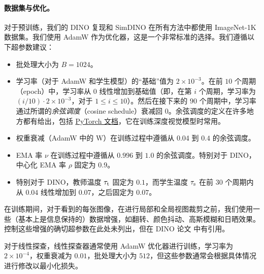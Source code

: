 \documentclass[../../book-main_zh.tex]{subfiles}
\begin{document}
\paragraph{数据集与优化。} 对于预训练，我们的 DINO 复现和 SimDINO 在所有方法中都使用 ImageNet-1K 数据集。我们使用 AdamW \citep{Loshchilov2017DecoupledWD} 作为优化器，这是一个非常标准的选择。我们遵循以下超参数建议：
\begin{itemize}
    \item 批处理大小为 \(B = 1024\)。
    \item 学习率（对于 AdamW 和学生模型）的“基础”值为 \(2 \times 10^{-3}\)。在前 \(10\) 个周期（epoch）中，学习率从 \(0\) 线性增加到基础值（即，在第 \(i\) 个周期，学习率为 \((i/10) \cdot 2 \times 10^{-3}\)，对于 \(1 \leq i \leq 10\)）。然后在接下来的 \(90\) 个周期中，学习率通过所谓的\textit{余弦调度}（cosine schedule）衰减回 \(0\)。余弦调度的定义在许多地方都有给出，包括 \href{https://pytorch.org/docs/stable/generated/torch.optim.lr_scheduler.CosineAnnealingLR.html}{PyTorch 文档}，它在训练深度视觉模型时常用。
    \item 权重衰减（AdamW 中的 W）在训练过程中遵循从 0.04 到 \(0.4\) 的余弦调度。
    \item EMA 率 \(\nu\) 在训练过程中遵循从 \(0.996\) 到 \(1.0\) 的余弦调度。特别对于 DINO，中心化 EMA 率 \(\rho\) 固定为 \(0.9\)。
    \item 特别对于 DINO，教师温度 \(\tau_{\mathrm{t}}\) 固定为 \(0.1\)，而学生温度 \(\tau_{\mathrm{s}}\) 在前 \(30\) 个周期内从 \(0.04\) 线性增加到 \(0.07\)，之后固定为 \(0.07\)。
\end{itemize}
在训练期间，对于看到的每张图像，在进行局部和全局视图裁剪之前，我们使用一些（基本上是信息保持的）数据增强，如翻转、颜色抖动、高斯模糊和日晒效果。控制这些增强的确切超参数在此处未列出，但在 DINO 论文 \citep{caron2021emerging} 中有引用。

对于线性探查，线性探查器通常使用 AdamW 优化器进行训练，学习率为 \(2 \times 10^{-4}\)，权重衰减为 \(0.01\)，批处理大小为 \(512\)，但这些参数通常会根据具体情况进行修改以最小化损失。
\end{document}
